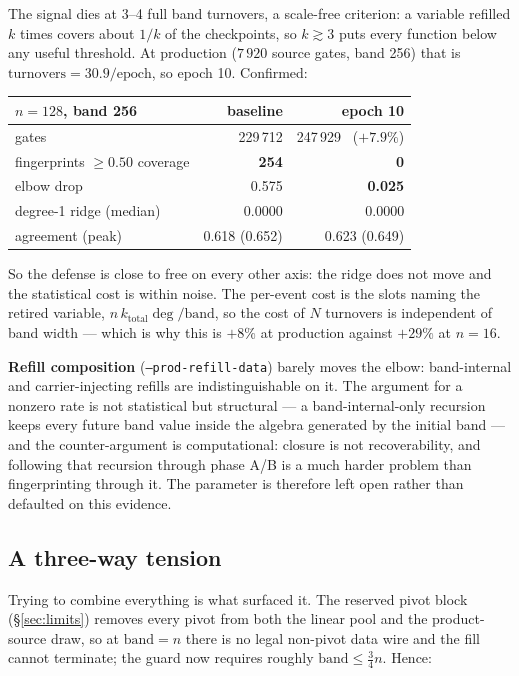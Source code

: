 \documentclass[11pt]{article}
\newcommand{\code}[1]{\texttt{#1}}
\begin{document}
The signal dies at 3--4 full band turnovers, a scale-free criterion: a variable
refilled $k$ times covers about $1/k$ of the checkpoints, so $k \gtrsim 3$ puts
every function below any useful threshold. At production ($7\,920$ source
gates, band 256) that is $\text{turnovers} = 30.9/\text{epoch}$, so epoch 10.
Confirmed:

\begin{center}
\begin{tabular}{lrr}
\toprule
$n{=}128$, band 256 & baseline & epoch 10 \\
\midrule
gates & 229\,712 & 247\,929 \ ($+7.9\%$) \\
fingerprints $\ge 0.50$ coverage & \textbf{254} & \textbf{0} \\
elbow drop & 0.575 & \textbf{0.025} \\
degree-1 ridge (median) & 0.0000 & 0.0000 \\
agreement (peak) & 0.618 (0.652) & 0.623 (0.649) \\
\bottomrule
\end{tabular}
\end{center}

So the defense is close to free on every other axis: the ridge does not move
and the statistical cost is within noise. The per-event cost is the slots
naming the retired variable, $n\,k_{\mathrm{total}}\deg/\text{band}$, so the
cost of $N$ turnovers is independent of band width --- which is why this is
$+8\%$ at production against $+29\%$ at $n{=}16$.

\textbf{Refill composition} (\code{--prod-refill-data}) barely moves the elbow:
band-internal and carrier-injecting refills are indistinguishable on it. The
argument for a nonzero rate is not statistical but structural --- a
band-internal-only recursion keeps every future band value inside the algebra
generated by the initial band --- and the counter-argument is computational:
closure is not recoverability, and following that recursion through phase A/B
is a much harder problem than fingerprinting through it. The parameter is
therefore left open rather than defaulted on this evidence.

\subsection{A three-way tension}

Trying to combine everything is what surfaced it. The reserved pivot block
(\S\ref{sec:limits}) removes every pivot from both the linear pool and the
product-source draw, so at $\text{band} = n$ there is no legal non-pivot data
wire and the fill cannot terminate; the guard now requires roughly
$\text{band} \le \tfrac34 n$. Hence:
\end{document}

